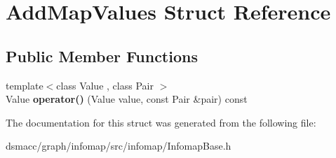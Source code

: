 \hypertarget{structAddMapValues}{}\section{Add\+Map\+Values Struct Reference}
\label{structAddMapValues}
\subsection*{Public Member Functions}
\begin{DoxyCompactItemize}
\item 
\mbox{\label{structAddMapValues_a4e5ab02b93cbdb63760b72237052b9e2}} 
{\footnotesize template$<$class Value , class Pair $>$ }\\Value {\bfseries operator()} (Value value, const Pair \&pair) const
\end{DoxyCompactItemize}


The documentation for this struct was generated from the following file\+:\begin{DoxyCompactItemize}
\item 
dsmacc/graph/infomap/src/infomap/Infomap\+Base.\+h\end{DoxyCompactItemize}
